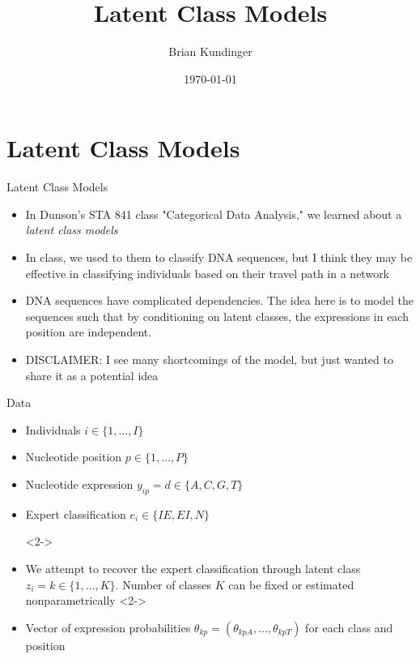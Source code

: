 \documentclass{beamer}
\begin{document}
	\title{Latent Class Models}
	\author{Brian Kundinger}
	\date{\today}
	



\section{Latent Class Models}

	\begin{frame}{Latent Class Models}
	\begin{itemize}
		\item In Dunson's STA 841 class "Categorical Data Analysis," we learned about a \emph{latent class models}
		\item In class, we used to them to classify DNA sequences, but I think they may be effective in classifying individuals based on their travel path in a network
		\item DNA sequences have complicated dependencies. The idea here is to model the sequences such that by conditioning on latent classes, the expressions in each position are independent.  
		
		
		\item DISCLAIMER: I see many shortcomings of the model, but just wanted to share it as a potential idea
	\end{itemize}
	\end{frame}

\begin{frame}{Data}
	\begin{itemize}
		\item Individuals $i \in \{1, \ldots, I \}$
		\item Nucleotide position $p \in \{1, \ldots, P \}$
		\item Nucleotide expression  $y_{ip} = d \in \{A, C, G, T\}$
		\item Expert classification $e_i \in \{IE, EI, N\}$
		
		<2->\item We attempt to recover the expert classification through latent class $z_i = k \in \{1, \ldots, K\}$. Number of classes $K$ can be fixed or estimated nonparametrically
		<2->\item Vector of expression probabilities $\theta_{kp} = (\theta_{kpA}, \ldots, \theta_{kpT})$ for each class and position
	\end{itemize}
\end{frame}
\end{document}

